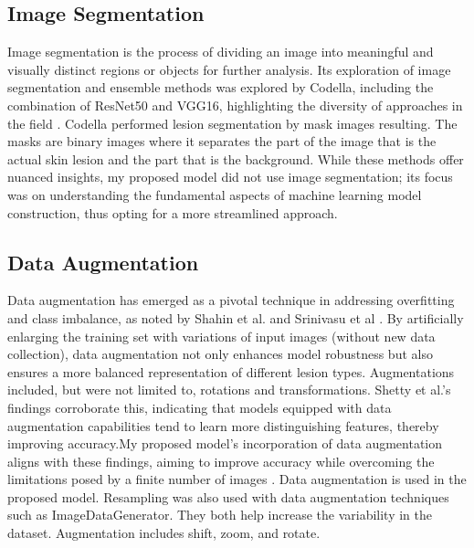 \documentclass[10pt,twocolumn]{article}
\begin{document}
\subsection{Image Segmentation}
Image segmentation is the process of dividing an image into meaningful and visually distinct regions or objects for further analysis. Its exploration of image segmentation and ensemble methods was explored by Codella, including the combination of ResNet50 and VGG16, highlighting the diversity of approaches in the field \cite{codella2018skin}. \newline
Codella performed lesion segmentation by mask images resulting. The masks are binary images where it separates the part of the image that is the actual skin lesion and the part that is the background. While these methods offer nuanced insights, my proposed model did not use image segmentation; its focus was on understanding the fundamental aspects of machine learning model construction, thus opting for a more streamlined approach.

\subsection{Data Augmentation}
Data augmentation has emerged as a pivotal technique in addressing overfitting and class imbalance, as noted by Shahin et al. and Srinivasu et al \cite{shahin2018deep} \cite{srinivasu2021classification}. By artificially enlarging the training set with variations of input images (without new data collection), data augmentation not only enhances model robustness but also ensures a more balanced representation of different lesion types. Augmentations included, but were not limited to, rotations and transformations. \newline \newline
Shetty et al.'s findings corroborate this, indicating that models equipped with data augmentation capabilities tend to learn more distinguishing features, thereby improving accuracy.My proposed model's incorporation of data augmentation aligns with these findings, aiming to improve accuracy while overcoming the limitations posed by a finite number of images \cite{shetty2022skin}. \newline \newline
Data augmentation is used in the proposed model. Resampling was also used with data augmentation techniques such as ImageDataGenerator. They both help increase the variability in the dataset. Augmentation includes shift, zoom, and rotate.
\end{document}
